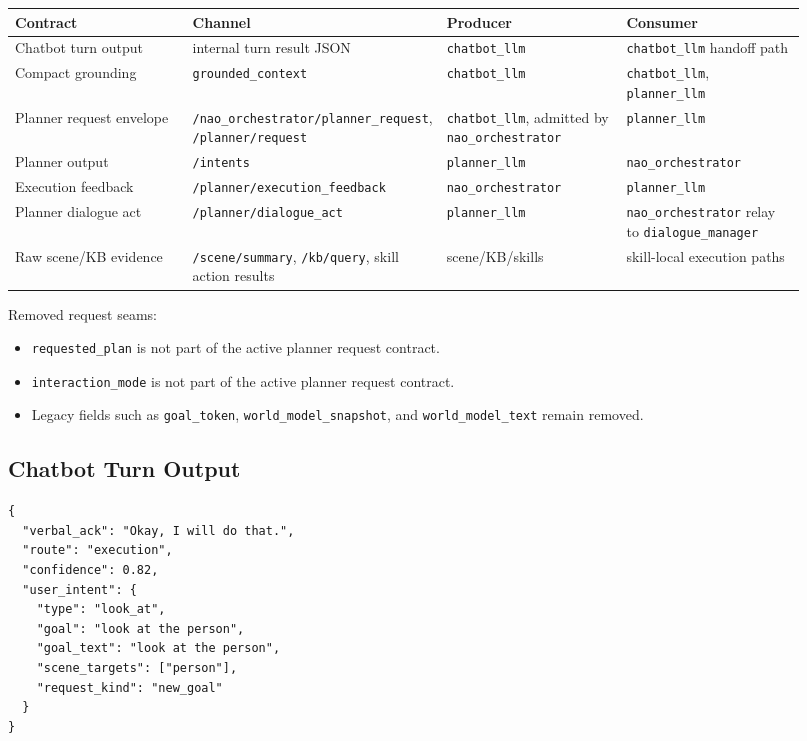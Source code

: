 \documentclass[12pt,a4paper]{article}
\newcommand{\code}[1]{\texttt{#1}}
\begin{document}
\begin{longtable}{p{0.23\linewidth}p{0.23\linewidth}p{0.23\linewidth}p{0.23\linewidth}}
Contract & Channel & Producer & Consumer\\
\midrule
Chatbot turn output & internal turn result JSON & \code{chatbot\_llm} & \code{chatbot\_llm} handoff path\\
Compact grounding & \code{grounded\_context} & \code{chatbot\_llm} & \code{chatbot\_llm}, \code{planner\_llm}\\
Planner request envelope & \code{/nao\_orchestrator/planner\_request}, \code{/planner/request} & \code{chatbot\_llm}, admitted by \code{nao\_orchestrator} & \code{planner\_llm}\\
Planner output & \code{/intents} & \code{planner\_llm} & \code{nao\_orchestrator}\\
Execution feedback & \code{/planner/execution\_feedback} & \code{nao\_orchestrator} & \code{planner\_llm}\\
Planner dialogue act & \code{/planner/dialogue\_act} & \code{planner\_llm} & \code{nao\_orchestrator} relay to \code{dialogue\_manager}\\
Raw scene/KB evidence & \code{/scene/summary}, \code{/kb/query}, skill action results & scene/KB/skills & skill-local execution paths\\
\end{longtable}

Removed request seams:

\begin{itemize}
\item \code{requested\_plan} is not part of the active planner request contract.
\item \code{interaction\_mode} is not part of the active planner request contract.
\item Legacy fields such as \code{goal\_token}, \code{world\_model\_snapshot}, and \code{world\_model\_text} remain removed.
\end{itemize}



\subsection{Chatbot Turn Output}

\begin{lstlisting}
{
  "verbal_ack": "Okay, I will do that.",
  "route": "execution",
  "confidence": 0.82,
  "user_intent": {
    "type": "look_at",
    "goal": "look at the person",
    "goal_text": "look at the person",
    "scene_targets": ["person"],
    "request_kind": "new_goal"
  }
}
\end{lstlisting}
\end{document}
